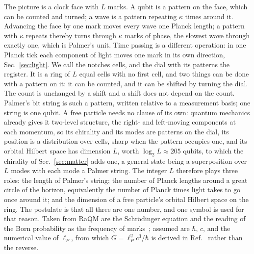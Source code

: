 \documentclass[aps,prd,twocolumn,superscriptaddress,nofootinbib]{revtex4-2}
\begin{document}
The picture is a clock face with $L$ marks. A qubit is a pattern on the face, which can be counted and turned; a wave is a pattern repeating $\kappa$ times around it. Advancing the face by one mark moves every wave one Planck length; a pattern with $\kappa$ repeats thereby turns through $\kappa$ marks of phase, the slowest wave through exactly one, which is Palmer's unit. Time passing is a different operation: in one Planck tick each component of light moves one mark in its own direction, Sec.~\ref{sec:light}. We call the notches cells, and the dial with its patterns the register. It is a ring of $L$ equal cells with no first cell, and two things can be done with a pattern on it: it can be counted, and it can be shifted by turning the dial. The count is unchanged by a shift and a shift does not depend on the count. Palmer's bit string is such a pattern, written relative to a measurement basis; one string is one qubit. A free particle needs no clause of its own: quantum mechanics already gives it two-level structure, the right- and left-moving components at each momentum, so its chirality and its modes are patterns on the dial, its position is a distribution over cells, sharp when the pattern occupies one, and its orbital Hilbert space has dimension $L$, worth $\log_2L\approx205$ qubits, to which the chirality of Sec.~\ref{sec:matter} adds one, a general state being a superposition over $L$ modes with each mode a Palmer string. The integer $L$ therefore plays three roles: the length of Palmer's string; the number of Planck lengths around a great circle of the horizon, equivalently the number of Planck times light takes to go once around it; and the dimension of a free particle's orbital Hilbert space on the ring. The postulate is that all three are one number, and one symbol is used for that reason. Taken from RaQM are the Schr\"odinger equation and the reading of the Born probability as the frequency of marks~\cite{palmer2026}; assumed are $\hbar$, $c$, and the numerical value of $\ell_P$, from which $G = \ell_P^2c^3/\hbar$ is derived in Ref.~\cite{korytko2026} rather than the reverse.
\end{document}
